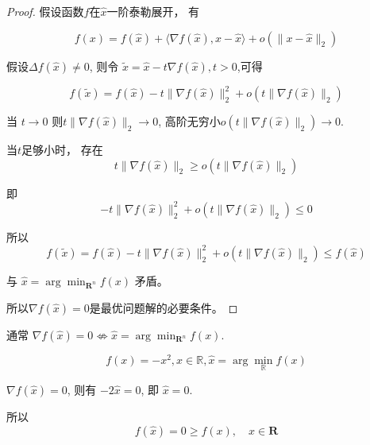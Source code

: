 \begin{proof}
    假设函数$f$在$\hat{x}$一阶泰勒展开， 有

    \begin{equation} f(x)=f(\hat{x})+\langle\nabla f(\hat{x}), x-\hat{x}\rangle+o\left(\|x-\hat{x}\|_{2}\right) \end{equation}

    假设$ \Delta f(\hat{x}) \neq 0 $, 则令 $ \tilde{x}=\hat{x}-t \nabla f(\hat{x}), t>0 $,可得

    \begin{equation} f(\tilde{x})=f(\hat{x})-t\|\nabla f(\hat{x})\|_{2}^{2}+o\left(t\|\nabla f(\hat{x})\|_{2}\right) \end{equation}

    当 $ t \rightarrow 0 $ 则$ t\|\nabla f(\hat{x})\|_{2} \rightarrow 0 $,  高阶无穷小$ {o }\left(t\|\nabla f(\hat{x})\|_{2}\right) \rightarrow 0 $.

    当$t$足够小时， 存在\begin{equation} t\|\nabla f(\hat{x})\|_{2} \geq o\left(t\|\nabla f(\hat{x})\|_{2}\right) \end{equation}
    
    即\begin{equation} -t\|\nabla f(\hat{x})\|_{2}^{2}+o\left(t\|\nabla f(\hat{x})\|_{2}\right) \leq 0 \end{equation}

    所以
    \begin{equation} f(\tilde{x})=f(\hat{x})-t\|\nabla f(\hat{x})\|_{2}^{2}+o\left(t\|\nabla f(\hat{x})\|_{2}\right) \leq f(\hat{x}) \end{equation}
    
    与 $ \hat{x}=\arg \min _{\mathbf{R}^{n}} f(x) $ 矛盾。 

    所以$ \nabla f(\widehat{x})=0 $是最优问题解的必要条件。 
\end{proof}

\begin{remark}
    通常 $ \nabla f(\hat{x})=0 \not \Leftrightarrow \hat{x}=\arg \min _{\mathbf{R}^{n}} f(x) $. 
\end{remark}

\begin{example}
    \begin{equation} f(x)=-x^{2},  x \in \mathbb{R}, \hat{x}=\arg \min _{\mathbb{R}} f(x) \end{equation}

    $ \nabla f(\hat{x})=0 $, 则有 $ -2 \hat{x}=0 $, 即 $ \hat{x}=0 $.

    所以
    \begin{equation} f(\hat{x})=0 \geq f(x), \quad x \in \mathbf{R} \end{equation}


\end{example}


